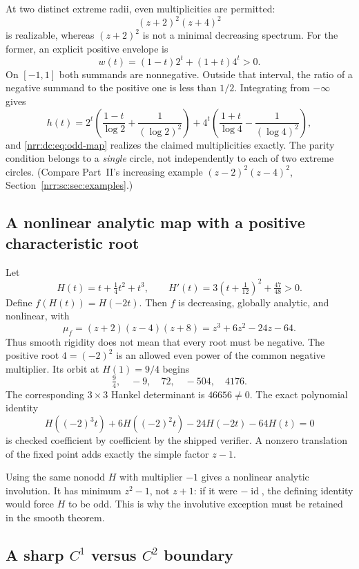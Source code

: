 \documentclass[11pt,letterpaper]{article}
\theoremstyle{definition}
\theoremstyle{remark}
\newcommand{\id}{\operatorname{id}}
\begin{document}
At two distinct extreme radii, even multiplicities are permitted:
\[
 (z+2)^2(z+4)^2
\]
is realizable, whereas $(z+2)^2$ is not a minimal decreasing spectrum.
For the former, an explicit positive envelope is
\[
 w(t)=(1-t)2^t+(1+t)4^t>0.
\]
On $[-1,1]$ both summands are nonnegative. Outside that interval,
the ratio of a negative summand to the positive one is less than
$1/2$. Integrating from $-\infty$ gives
\[
 h(t)=2^t\left(\frac{1-t}{\log2}+\frac1{(\log2)^2}\right)
 +4^t\left(\frac{1+t}{\log4}-\frac1{(\log4)^2}\right),
\]
and \eqref{nrr:dc:eq:odd-map} realizes the claimed multiplicities exactly.
The parity condition belongs to a \emph{single} circle, not independently
to each of two extreme circles. (Compare Part~II's increasing example
$(z-2)^2(z-4)^2$, Section~\ref{nrr:sc:sec:examples}.)

\subsection{A nonlinear analytic map with a positive characteristic root}

Let
\begin{equation}
 H(t)=t+\tfrac14t^2+t^3,
 \qquad H'(t)=3\left(t+\tfrac1{12}\right)^2+\tfrac{47}{48}>0.
 \label{nrr:dc:eq:H-example}
\end{equation}
Define $f(H(t))=H(-2t)$. Then $f$ is decreasing, globally analytic,
and nonlinear, with
\begin{equation}
 \mu_f=(z+2)(z-4)(z+8)=z^3+6z^2-24z-64.
 \label{nrr:dc:eq:smooth-cubic}
\end{equation}
Thus smooth rigidity does not mean that every root must be negative.
The positive root $4=(-2)^2$ is an allowed even power of the common
negative multiplier. Its orbit at $H(1)=9/4$ begins
\[
 \tfrac94,\quad -9,\quad72,\quad-504,\quad4176.
\]
The corresponding $3\times3$ Hankel determinant is $46656\ne0$.
The exact polynomial identity
\[
 H((-2)^3t)+6H((-2)^2t)-24H(-2t)-64H(t)=0
\]
is checked coefficient by coefficient by the shipped verifier.
A nonzero translation of the fixed point adds exactly the simple
factor $z-1$.

Using the same nonodd $H$ with multiplier $-1$ gives a nonlinear
analytic involution. It has minimum $z^2-1$, not $z+1$:
if it were $-\id$, the defining identity would force $H$ to be odd.
This is why the involutive exception must be retained in the smooth theorem.

\subsection{\texorpdfstring{A sharp $C^1$ versus $C^2$ boundary}{A sharp C1 versus C2 boundary}}
\end{document}
